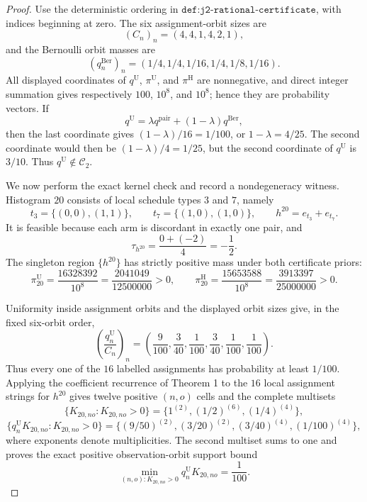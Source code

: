 \documentclass{article}
\begin{document}
\begin{proof}
Use the deterministic ordering in \(\texttt{def:j2-rational-certificate}\), with indices beginning at zero. The six assignment-orbit sizes are
\[
 (C_n)_n=(4,4,1,4,2,1),
\]
and the Bernoulli orbit masses are
\[
 (q_n^{\mathrm{Ber}})_n=(1/4,1/4,1/16,1/4,1/8,1/16).
\]
All displayed coordinates of \(q^{\mathrm U}\), \(\pi^{\mathrm U}\), and \(\pi^{\mathrm H}\) are nonnegative, and direct integer summation gives respectively \(100\), \(10^8\), and \(10^8\); hence they are probability vectors. If
\[
 q^{\mathrm U}=\lambda q^{\mathrm{pair}}+(1-\lambda)q^{\mathrm{Ber}},
\]
then the last coordinate gives \((1-\lambda)/16=1/100\), or \(1-\lambda=4/25\). The second coordinate would then be \((1-\lambda)/4=1/25\), but the second coordinate of \(q^{\mathrm U}\) is \(3/10\). Thus \(q^{\mathrm U}\notin\mathcal C_2\).

We now perform the exact kernel check and record a nondegeneracy witness. Histogram \(20\) consists of local schedule types \(3\) and \(7\), namely
\[
 t_3=\{(0,0),(1,1)\},
 \qquad
 t_7=\{(1,0),(1,0)\},
 \qquad
 h^{20}=e_{t_3}+e_{t_7}.
\]
It is feasible because each arm is discordant in exactly one pair, and
\[
 \tau_{h^{20}}=\frac{0+(-2)}4=-\frac12.
\]
The singleton region \(\{h^{20}\}\) has strictly positive mass under both certificate priors:
\[
 \pi^{\mathrm U}_{20}=\frac{16328392}{10^8}
 =\frac{2041049}{12500000}>0,
 \qquad
 \pi^{\mathrm H}_{20}=\frac{15653588}{10^8}
 =\frac{3913397}{25000000}>0.
\]

Uniformity inside assignment orbits and the displayed orbit sizes give, in the fixed six-orbit order,
\[
 \left(\frac{q_n^{\mathrm U}}{C_n}\right)_n
 =\left(\frac9{100},\frac3{40},\frac1{100},
 \frac3{40},\frac1{100},\frac1{100}\right).
\]
Thus every one of the \(16\) labelled assignments has probability at least \(1/100\). Applying the coefficient recurrence of Theorem 1 to the \(16\) local assignment strings for \(h^{20}\) gives twelve positive \((n,o)\) cells and the complete multisets
\[
 \{K_{20,no}:K_{20,no}>0\}
 =\{1^{(2)},(1/2)^{(6)},(1/4)^{(4)}\},
\]
\[
 \{q_n^{\mathrm U}K_{20,no}:K_{20,no}>0\}
 =\{(9/50)^{(2)},(3/20)^{(2)},(3/40)^{(4)},(1/100)^{(4)}\},
\]
where exponents denote multiplicities. The second multiset sums to one and proves the exact positive observation-orbit support bound
\[
 \min_{(n,o):K_{20,no}>0}q_n^{\mathrm U}K_{20,no}=\frac1{100}.
\]


\end{proof}
\end{document}
